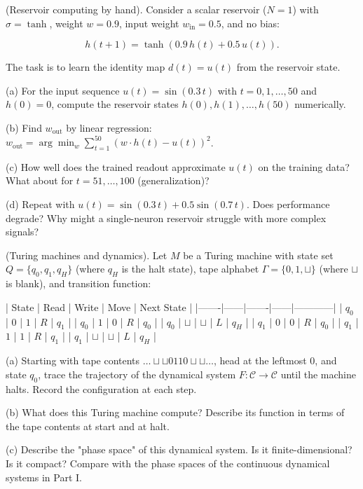 \begin{exercise}
(Reservoir computing by hand). Consider a scalar reservoir ($N = 1$) with $\sigma = \tanh$, weight $w = 0.9$, input weight $w_{\text{in}} = 0.5$, and no bias:

\[
h(t+1) = \tanh(0.9\, h(t) + 0.5\, u(t)).
\]

The task is to learn the identity map $d(t) = u(t)$ from the reservoir state.

(a) For the input sequence $u(t) = \sin(0.3\, t)$ with $t = 0, 1, \ldots, 50$ and $h(0) = 0$, compute the reservoir states $h(0), h(1), \ldots, h(50)$ numerically.

(b) Find $w_{\text{out}}$ by linear regression: $w_{\text{out}} = \arg\min_w \sum_{t=1}^{50} (w \cdot h(t) - u(t))^2$.

(c) How well does the trained readout approximate $u(t)$ on the training data? What about for $t = 51, \ldots, 100$ (generalization)?

(d) Repeat with $u(t) = \sin(0.3\, t) + 0.5\sin(0.7\, t)$. Does performance degrade? Why might a single-neuron reservoir struggle with more complex signals?


\bigskip

\end{exercise}


\begin{exercise}
(Turing machines and dynamics). Let $M$ be a Turing machine with state set $Q = \{q_0, q_1, q_H\}$ (where $q_H$ is the halt state), tape alphabet $\Gamma = \{0, 1, \sqcup\}$ (where $\sqcup$ is blank), and transition function:

| State | Read | Write | Move | Next State |
|-------|------|-------|------|------------|
| $q_0$ | $0$ | $1$ | $R$ | $q_1$ |
| $q_0$ | $1$ | $0$ | $R$ | $q_0$ |
| $q_0$ | $\sqcup$ | $\sqcup$ | $L$ | $q_H$ |
| $q_1$ | $0$ | $0$ | $R$ | $q_0$ |
| $q_1$ | $1$ | $1$ | $R$ | $q_1$ |
| $q_1$ | $\sqcup$ | $\sqcup$ | $L$ | $q_H$ |

(a) Starting with tape contents $\ldots \sqcup\sqcup 0110 \sqcup\sqcup \ldots$, head at the leftmost $0$, and state $q_0$, trace the trajectory of the dynamical system $F: \mathcal{C} \to \mathcal{C}$ until the machine halts. Record the configuration at each step.

(b) What does this Turing machine compute? Describe its function in terms of the tape contents at start and at halt.

(c) Describe the "phase space" of this dynamical system. Is it finite-dimensional? Is it compact? Compare with the phase spaces of the continuous dynamical systems in Part I.


\bigskip

\end{exercise}


